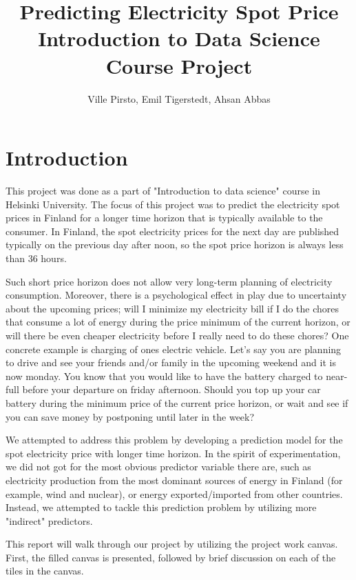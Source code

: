 \documentclass{article}
\title{%
	Predicting Electricity Spot Price\\
	\large Introduction to Data Science Course Project}
\author{Ville Pirsto, Emil Tigerstedt, Ahsan Abbas}
\numberwithin{equation}{section}
\begin{document}
\begin{titlepage}
	\maketitle
	\thispagestyle{empty}
\end{titlepage}

\tableofcontents
\clearpage

\section{Introduction}
This project was done as a part of "Introduction to data science" course in Helsinki University. The focus of this project was to predict the electricity spot prices in Finland for a longer time horizon that is typically available to the consumer. In Finland, the spot electricity prices for the next day are published typically on the previous day after noon, so the spot price horizon is always less than 36 hours. 

Such short price horizon does not allow very long-term planning of electricity consumption. Moreover, there is a psychological effect in play due to uncertainty about the upcoming prices; will I minimize my electricity bill if I do the chores that consume a lot of energy during the price minimum of the current horizon, or will there be even cheaper electricity before I really need to do these chores? One concrete example is charging of ones electric vehicle. Let's say you are planning to drive and see your friends and/or family in the upcoming weekend and it is now monday. You know that you would like to have the battery charged to near-full before your departure on friday afternoon. Should you top up your car battery during the minimum price of the current price horizon, or wait and see if you can save money by postponing until later in the week?

We attempted to address this problem by developing a prediction model for the spot electricity price with longer time horizon. In the spirit of experimentation, we did not got for the most obvious predictor variable there are, such as electricity production from the most dominant sources of energy in Finland (for example, wind and nuclear), or energy exported/imported from other countries. Instead, we attempted to tackle this prediction problem by utilizing more "indirect" predictors.

This report will walk through our project by utilizing the project work canvas. First, the filled canvas is presented, followed by brief discussion on each of the tiles in the canvas.
\end{document}
